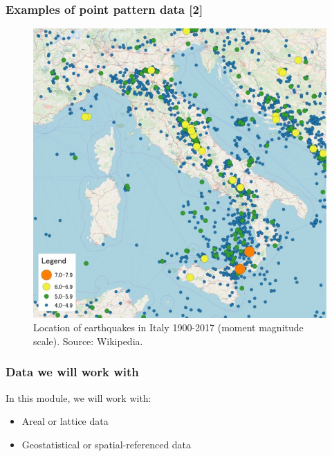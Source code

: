 \documentclass[12pt]{beamer}
\begin{document}
\begin{frame}
\frametitle{Examples of point pattern data [2]}
\begin{figure}
\includegraphics[scale=0.51]{Figures/Earthquakes_Italy.jpg}
\caption{\footnotesize Location of earthquakes in Italy 1900-2017 (moment magnitude scale). Source: Wikipedia.}
\end{figure}
\end{frame}

\begin{frame}
\frametitle{Data we will work with}
In this module, we will work with:

\begin{itemize}
 \item Areal or lattice data
 \item Geostatistical or spatial-referenced data
 \end{itemize}
\end{frame}
\end{document}
